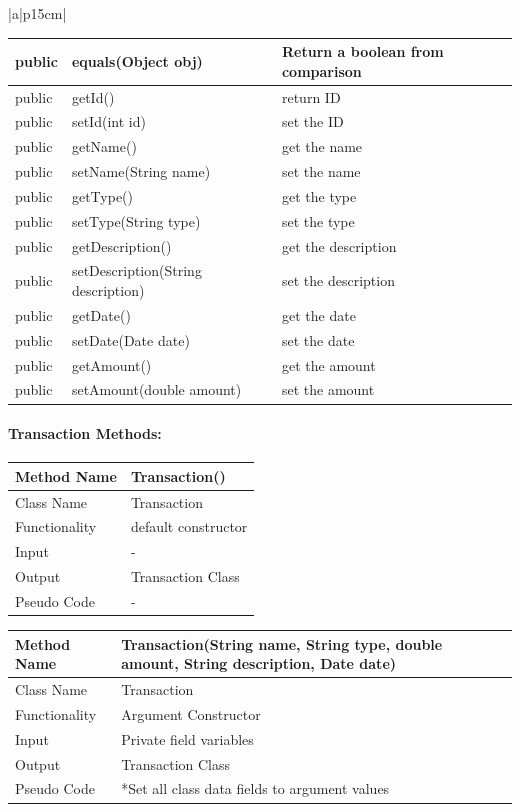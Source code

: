 \documentclass[12pt]{article}
\begin{document}
\begin{table}[H]
\begin{tabular}{|a|p{15cm}|}
\begin{tabular}{| p{2cm} | p{5cm} | p{6.9cm} |}
			\hline
			public &  equals(Object obj) & Return a boolean from comparison\\
			\hline
			public &   getId() & return ID\\
			\hline
			public &  setId(int id) &  set the ID\\
			\hline
			public &  getName()  & get the name\\
			\hline
			public &  setName(String name)  & set the name\\
			\hline
			public &  getType() & get the type\\
			\hline
			public &  setType(String type) & set the type\\
			\hline
			public &  getDescription() & get the description\\
			\hline
			public & setDescription(String description) & set the description\\
			\hline
			public &  getDate() & get the date\\
			\hline
			public &  setDate(Date date)  & set the date\\
			\hline
			public &  getAmount() & get the amount\\
			\hline
			public &   setAmount(double amount) & set the amount\\
			\hline
			
		\end{tabular}								 
	\end{tabular}
\end{table}

\paragraph{Transaction Methods:}

\begin{tabular}{ |p{3cm}||p{\colWidth}|  }
	\hline
	Method Name & Transaction()\\
	\hline
	Class Name & Transaction\\
	\hline
	Functionality & default constructor\\
	\hline
	Input & -\\
	\hline
	Output & Transaction Class\\
	\hline
	Pseudo Code & -\\
	\hline
\end{tabular}



\begin{tabular}{ |p{3cm}||p{\colWidth}|  }
	\hline
	Method Name &  Transaction(String name, String type, double amount, String description, Date date)\\
	\hline
	Class Name & Transaction\\
	\hline
	Functionality & Argument Constructor\\
	\hline
	Input & Private field variables\\
	\hline
	Output & Transaction Class\\
	\hline
	Pseudo Code & *Set all class data fields to argument values\\
	\hline
\end{tabular}
\end{document}
